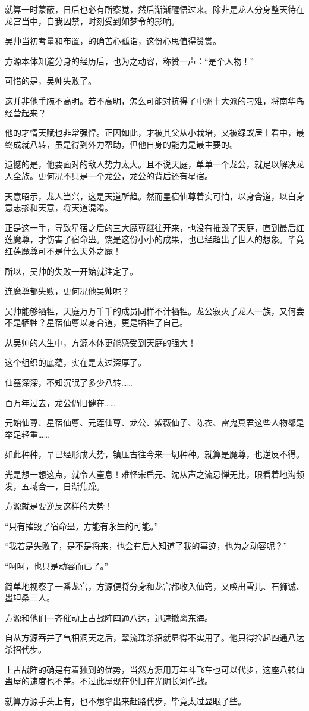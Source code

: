 \begin{this_body}
就算一时蒙蔽，日后也必有所察觉，然后渐渐醒悟过来。除非是龙人分身整天待在龙宫当中，自我囚禁，时刻受到如梦令的影响。

吴帅当初考量和布置，的确苦心孤诣，这份心思值得赞赏。

方源本体知道分身的经历后，也为之动容，称赞一声：“是个人物！”

可惜的是，吴帅失败了。

这并非他手腕不高明。若不高明，怎么可能对抗得了中洲十大派的刁难，将南华岛经营起来？

他的才情天赋也非常强悍。正因如此，才被其父从小栽培，又被绿蚁居士看中，最终成就八转，虽是得到外力帮助，但他自身的能力是最主要的。

遗憾的是，他要面对的敌人势力太大。且不说天庭，单单一个龙公，就足以解决龙人全族。更何况不只是一个龙公，龙公的背后还有星宿。

天意昭示，龙人当兴，这是天道所趋。然而星宿仙尊着实可怕，以身合道，以自身意志掺和天意，将天道混淆。

正是这一手，导致星宿之后的三大魔尊继往开来，也没有摧毁了天庭，直到最后红莲魔尊，才伤害了宿命蛊。饶是这份小小的成果，也已经超出了世人的想象。毕竟红莲魔尊可不是什么天外之魔！

所以，吴帅的失败一开始就注定了。

连魔尊都失败，更何况他吴帅呢？

吴帅能够牺牲，天庭万万千千的成员同样不计牺牲。龙公寂灭了龙人一族，又何尝不是牺牲？星宿仙尊以身合道，更是牺牲了自己。

从吴帅的人生中，方源本体更能感受到天庭的强大！

这个组织的底蕴，实在是太过深厚了。

仙墓深深，不知沉眠了多少八转……

百万年过去，龙公仍旧健在……

元始仙尊、星宿仙尊、元莲仙尊、龙公、紫薇仙子、陈衣、雷鬼真君这些人物都是举足轻重……

如此种种，早已经形成大势，镇压古往今来一切种种。就算是魔尊，也逆反不得。

光是想一想这点，就令人窒息！难怪宋启元、沈从声之流忌惮无比，眼看着地沟频发，五域合一，日渐焦躁。

方源就是要逆反这样的大势！

“只有摧毁了宿命蛊，方能有永生的可能。”

“我若是失败了，是不是将来，也会有后人知道了我的事迹，也为之动容呢？”

“呵呵，也只是动容而已了。”

简单地视察了一番龙宫，方源便将分身和龙宫都收入仙窍，又唤出雪儿、石狮诚、墨坦桑三人。

方源和他们一齐催动上古战阵四通八达，迅速撤离东海。

自从方源吞并了气相洞天之后，翠流珠杀招就显得不实用了。他只得捡起四通八达杀招代步。

上古战阵的确是有着独到的优势，当然方源用万年斗飞车也可以代步，这座八转仙蛊屋的速度也不差。不过此屋现在仍旧在光阴长河作战。

就算方源手头上有，也不想拿出来赶路代步，毕竟太过显眼了些。

\end{this_body}

